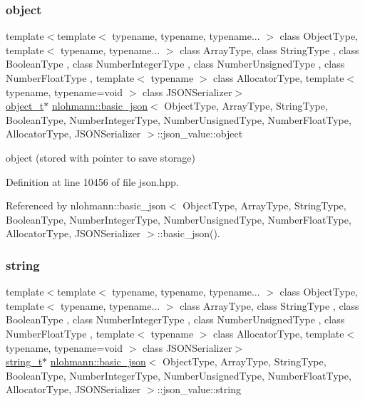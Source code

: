 \subsubsection{\texorpdfstring{object}{object}}
{\footnotesize\ttfamily template$<$template$<$ typename, typename, typename... $>$ class Object\+Type, template$<$ typename, typename... $>$ class Array\+Type, class String\+Type , class Boolean\+Type , class Number\+Integer\+Type , class Number\+Unsigned\+Type , class Number\+Float\+Type , template$<$ typename $>$ class Allocator\+Type, template$<$ typename, typename=void $>$ class J\+S\+O\+N\+Serializer$>$ \\
\hyperlink{classnlohmann_1_1basic__json_a5e48a7893520e1314bf0c9723e26ea2a}{object\+\_\+t}$\ast$ \hyperlink{classnlohmann_1_1basic__json}{nlohmann\+::basic\+\_\+json}$<$ Object\+Type, Array\+Type, String\+Type, Boolean\+Type, Number\+Integer\+Type, Number\+Unsigned\+Type, Number\+Float\+Type, Allocator\+Type, J\+S\+O\+N\+Serializer $>$\+::json\+\_\+value\+::object}



object (stored with pointer to save storage) 



Definition at line 10456 of file json.\+hpp.



Referenced by nlohmann\+::basic\+\_\+json$<$ Object\+Type, Array\+Type, String\+Type, Boolean\+Type, Number\+Integer\+Type, Number\+Unsigned\+Type, Number\+Float\+Type, Allocator\+Type, J\+S\+O\+N\+Serializer $>$\+::basic\+\_\+json().

\mbox{\label{unionnlohmann_1_1basic__json_1_1json__value_a9856fb4271b50d738e14c5a9a2f05118}} 
\subsubsection{\texorpdfstring{string}{string}}
{\footnotesize\ttfamily template$<$template$<$ typename, typename, typename... $>$ class Object\+Type, template$<$ typename, typename... $>$ class Array\+Type, class String\+Type , class Boolean\+Type , class Number\+Integer\+Type , class Number\+Unsigned\+Type , class Number\+Float\+Type , template$<$ typename $>$ class Allocator\+Type, template$<$ typename, typename=void $>$ class J\+S\+O\+N\+Serializer$>$ \\
\hyperlink{classnlohmann_1_1basic__json_a61f8566a1a85a424c7266fb531dca005}{string\+\_\+t}$\ast$ \hyperlink{classnlohmann_1_1basic__json}{nlohmann\+::basic\+\_\+json}$<$ Object\+Type, Array\+Type, String\+Type, Boolean\+Type, Number\+Integer\+Type, Number\+Unsigned\+Type, Number\+Float\+Type, Allocator\+Type, J\+S\+O\+N\+Serializer $>$\+::json\+\_\+value\+::string}



